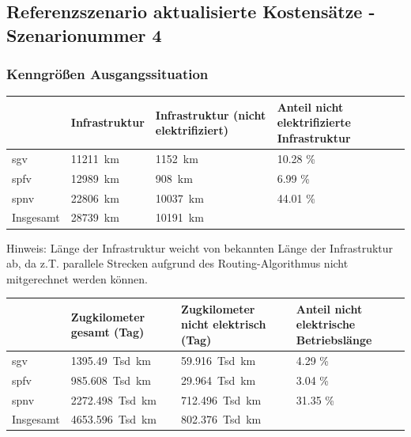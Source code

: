 \subsection{Referenzszenario aktualisierte Kostensätze - Szenarionummer 4}\label{chap_kenngrößen_s_4}

\subsubsection{Kenngrößen Ausgangssituation}
\begin{center}
	\begin{tabularx}{\textwidth}{l | X | X | X} & Infrastruktur & Infrastruktur (nicht elektrifiziert) & Anteil nicht elektrifizierte Infrastruktur \\
	\hline
	\acrshort{sgv} & \SI{11211}{\km} & \SI{1152}{\km} & \num{10.28} \% \\
	\acrshort{spfv} & \SI{12989}{\km} & \SI{908}{\km} & \num{6.99} \% \\
	\acrshort{spnv} & \SI{22806}{\km} & \SI{10037}{\km} & \num{44.01} \% \\
	\hline
	Insgesamt & \SI{28739}{\km} & \SI{10191}{\km} & \\
	\end{tabularx}
\end{center}
\hspace{2em}
Hinweis: Länge der Infrastruktur weicht von bekannten Länge der Infrastruktur ab, da z.T. parallele Strecken aufgrund des Routing-Algorithmus nicht mitgerechnet werden können.

\begin{center}
	\begin{tabularx}{\textwidth}{l | X | X | X} & Zugkilometer gesamt (Tag) & Zugkilometer nicht elektrisch (Tag) & Anteil nicht elektrische Betriebslänge \\
	\hline
	\acrshort{sgv} & \SI{1395.49}{Tsd. \km} & \SI{59.916}{Tsd. \km} & \num{4.29}  \% \\
	\acrshort{spfv} & \SI{985.608}{Tsd. \km} & \SI{29.964}{Tsd. \km} & \num{3.04} \% \\
	\acrshort{spnv} & \SI{2272.498}{Tsd. \km} & \SI{712.496}{Tsd. \km} & \num{31.35} \% \\
	\hline
	Insgesamt & \SI{4653.596}{Tsd. \km} & \SI{802.376}{Tsd. \km} & \\
	\end{tabularx}
\end{center}


